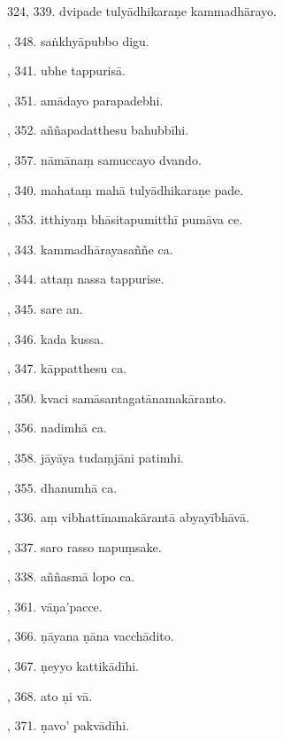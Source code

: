 324, 339. dvipade tulyādhikaraṇe kammadhārayo.\hfill \pageref{sut:324}\par {}, 348. saṅkhyāpubbo digu.\hfill \pageref{sut:325}\par {}, 341. ubhe tappurisā.\hfill \pageref{sut:326}\par {}, 351. amādayo parapadebhi.\hfill \pageref{sut:327}\par {}, 352. aññapadatthesu bahubbīhi.\hfill \pageref{sut:328}\par {}, 357. nāmānaṃ samuccayo dvando.\hfill \pageref{sut:329}\par {}, 340. mahataṃ mahā tulyādhikaraṇe pade.\hfill \pageref{sut:330}\par {}, 353. itthiyaṃ bhāsitapumitthī pumāva ce.\hfill \pageref{sut:331}\par {}, 343. kammadhārayasaññe ca.\hfill \pageref{sut:332}\par {}, 344. attaṃ nassa tappurise.\hfill \pageref{sut:333}\par {}, 345. sare an.\hfill \pageref{sut:334}\par {}, 346. kada kussa.\hfill \pageref{sut:335}\par {}, 347. kāppatthesu ca.\hfill \pageref{sut:336}\par {}, 350. kvaci samāsantagatānamakāranto.\hfill \pageref{sut:337}\par {}, 356. nadimhā ca.\hfill \pageref{sut:338}\par {}, 358. jāyāya tudaṃjāni patimhi.\hfill \pageref{sut:339}\par {}, 355. dhanumhā ca.\hfill \pageref{sut:340}\par {}, 336. aṃ vibhattīnamakārantā abyayībhāvā.\hfill \pageref{sut:341}\par {}, 337. saro rasso napuṃsake.\hfill \pageref{sut:342}\par {}, 338. aññasmā lopo ca.\hfill \pageref{sut:343}\par {}, 361. vāṇa’pacce.\par {}, 366. ṇāyana ṇāna vacchādito.\par {}, 367. ṇeyyo kattikādīhi.\par {}, 368. ato ṇi vā.\par {}, 371. ṇavo’ pakvādīhi.\par \noindent
